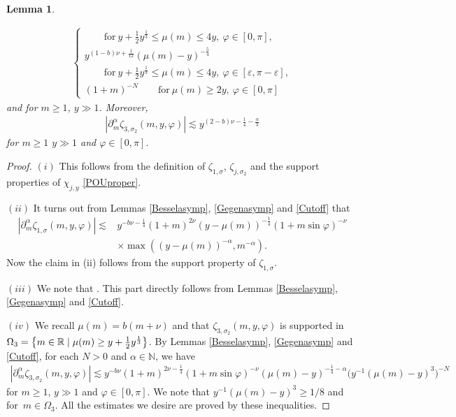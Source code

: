 \documentclass[10pt,a4paper]{article}
\numberwithin{equation}{section}
\newtheorem{Lemma}[Theorem]{Lemma}
\def\R{\mathbb{R}}%
\def\a{\alpha}
\def\e{\varepsilon}
\def\f{\varphi}
\def\m{\mu}
\def\n{\nu}
\def\s{\sigma}
\def\z{\zeta}
\def\pa{\partial}
\begin{document}
\begin{Lemma}
\begin{itemize}
\begin{align*}
\begin{cases}
\qquad \text{for}\  y+\frac{1}{2}y^{\frac{1}{3}}\leq \m(m)\leq 4y,\  \f\in [0,\pi],\\
y^{(1-b)\n+\frac{1}{12}}(\m(m)-y)^{-\frac{5}{4}}\\
\qquad \text{for}\  y+\frac{1}{2}y^{\frac{1}{3}}\leq \m(m)\leq 4y,\  \f\in [\e,\pi-\e],\\
(1+m)^{-N}\qquad \text{for}\  \m(m)\geq 2y,\  \f\in [0,\pi]
\end{cases}
\end{align*}
and for $m\geq 1$, $y\gg 1$. Moreover,
\begin{align*}
|\pa_{m}^{\a}\z_{3,\s_2}(m,y,\f)|\lesssim y^{(2-b)\n-\frac{1}{4}-\frac{\a}{3}}
\end{align*}
for $m\geq 1$ $y\gg 1$ and $\f\in [0,\pi]$.
\end{itemize}
\end{Lemma}

\begin{proof}
 $(i)$ This follows from the definition of $\z_{1,\s}$, $\z_{j,\s_2}$ and the support properties of $\chi_{j,y}$ \eqref{POUproper}.

$(ii)$ It turns out from Lemmas \ref{Besselasymp}, \ref{Gegenasymp} and \ref{Cutoff} that
\begin{align*}
|\pa_{m}^{\a}\z_{1,\s}(m,y,\f)|\lesssim {}&y^{-b\n-\frac{1}{4}}(1+m)^{2\n}(y-\m(m))^{-\frac{1}{4}}(1+m\sin \f)^{-\n}\\
&\times \max((y-\m(m))^{-\a}, m^{-\a}).
\end{align*}
Now the claim in (ii) follows from the support property of $\z_{1,\s}$.

 $(iii)$ We note that \smash{$\Omega_2=\big\{m\in\R\mid y-2y^{\frac{1}{3}}\leq \m(m)\leq y+2y^{\frac{1}{3}}\big\}$}. This part directly follows from Lemmas \ref{Besselasymp}, \ref{Gegenasymp} and \ref{Cutoff}.

 $(iv)$ We recall $\m(m)=b(m+\n)$ and that $\z_{3,\s_2}(m,y,\f)$ is supported in $\Omega_3=\big\{m\in\R\mid \m(m)\geq y+\smash{\frac{1}{2}y^{\frac{1}{3}}}\big\}$.
By Lemmas \ref{Besselasymp}, \ref{Gegenasymp} and \ref{Cutoff}, for each $N>0$ and $\a\in\mathbb{N}$, we have
\begin{align*}
|\pa_{m}^{\a}\z_{3,\s_2}(m,y,\f)|\lesssim y^{-b\n}(1+m)^{2\n-\frac{1}{4}}(1+m\sin \f)^{-\n}(\m(m)-y)^{-\frac{1}{4}-\a}\bigl(y^{-1}(\m(m)-y)^3\bigr)^{-N}
\end{align*}
for $m\geq 1$, $y\gg 1$ and $\f\in [0,\pi]$. We note that $y^{-1}(\m(m)-y)^3\geq 1/8$ and \smash{$\m(m)-y\geq \frac{1}{2}y^{\frac{1}{3}}$} for~${m\in \Omega_3}$. All the estimates we desire are proved by these inequalities.
\end{proof}
\end{document}
